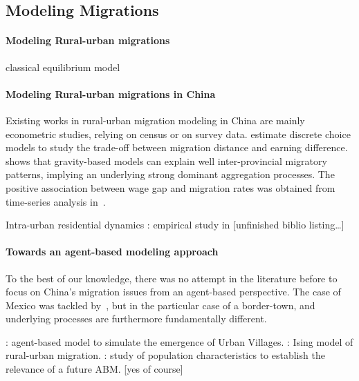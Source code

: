 \subsection{Modeling Migrations}

\paragraph{Modeling Rural-urban migrations}

\cite{todaro1969model} classical equilibrium model


\paragraph{Modeling Rural-urban migrations in China}

Existing works in rural-urban migration modeling in China are mainly econometric studies, relying on census or on survey data. \cite{zhang2013measuring} estimate discrete choice models to study the trade-off between migration distance and earning difference. \cite{fan2005modeling} shows that gravity-based models can explain well inter-provincial migratory patterns, implying an underlying strong dominant aggregation processes. The positive association between wage gap and migration rates was obtained from time-series analysis in~\cite{zhang2003rural}.

Intra-urban residential dynamics : empirical study in \cite{wu2006migrant} [unfinished biblio listing\ldots]

\paragraph{Towards an agent-based modeling approach}

To the best of our knowledge, there was no attempt in the literature before to focus on China's migration issues from an agent-based perspective. The case of Mexico was tackled by~\cite{de2007netlogo}, but in the particular case of a border-town, and underlying processes are furthermore fundamentally different.

\cite{xie2007simulating} : agent-based model to simulate the emergence of Urban Villages. \cite{silveira2006agent} : Ising model of rural-urban migration. \cite{fernandez2005characterizing} : study of population characteristics to establish the relevance of a future ABM. [yes of course]

